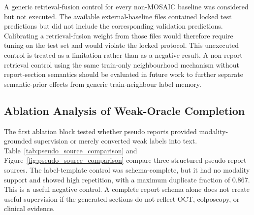 \documentclass[11pt, a4paper]{article}
\theoremstyle{plain}
\theoremstyle{definition}
\begin{document}
A generic retrieval-fusion control for every non-MOSAIC baseline was considered but not executed. The available external-baseline files contained locked test predictions but did not include the corresponding validation predictions. Calibrating a retrieval-fusion weight from those files would therefore require tuning on the test set and would violate the locked protocol. This unexecuted control is treated as a limitation rather than as a negative result. A non-report retrieval control using the same train-only neighbourhood mechanism without report-section semantics should be evaluated in future work to further separate semantic-prior effects from generic train-neighbour label memory.

\FloatBarrier

\subsection{Ablation Analysis of Weak-Oracle Completion}
\label{subsec:pseudo_report_results}

The first ablation block tested whether pseudo reports provided modality-grounded supervision or merely converted weak labels into text. Table~\ref{tab:pseudo_source_comparison} and Figure~\ref{fig:pseudo_source_comparison} compare three structured pseudo-report sources. The label-template control was schema-complete, but it had no modality support and showed high repetition, with a maximum duplicate fraction of 0.867. This is a useful negative control. A complete report schema alone does not create useful supervision if the generated sections do not reflect OCT, colposcopy, or clinical evidence.
\end{document}
